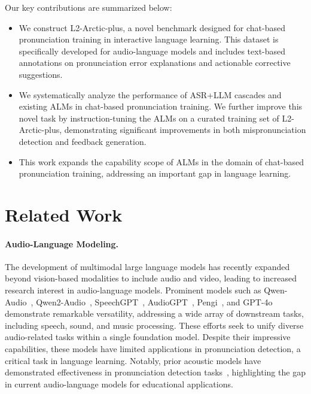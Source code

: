 \documentclass[11pt]{article}
\begin{document}
Our key contributions are summarized below: 
\begin{itemize}
    \item We construct L2-Arctic-plus, a novel benchmark designed for chat-based pronunciation training in interactive language learning. This dataset is specifically developed for audio-language models and includes text-based annotations on pronunciation error explanations and actionable corrective suggestions. 
    \item We systematically analyze the performance of ASR+LLM cascades and existing ALMs in chat-based pronunciation training. We further improve this novel task by instruction-tuning the ALMs on a curated training set of L2-Arctic-plus, demonstrating significant improvements in both mispronunciation detection and feedback generation.
    \item This work expands the capability scope of ALMs in the domain of chat-based pronunciation training, addressing an important gap in language learning. %
\end{itemize}


\section{Related Work}

\paragraph{Audio-Language Modeling.} The development of multimodal large language models has recently expanded beyond vision-based modalities to include audio and video, leading to increased research interest in audio-language models. Prominent models such as Qwen-Audio~\cite{qwen-audio-1}, Qwen2-Audio~\cite{qwen-audio-2}, SpeechGPT~\cite{speechgpt}, AudioGPT~\cite{audiogpt}, Pengi~\cite{pengi}, and GPT-4o~\cite{gpt-4o} demonstrate remarkable versatility, addressing a wide array of downstream tasks, including speech, sound, and music processing. These efforts seek to unify diverse audio-related tasks within a single foundation model. Despite their impressive capabilities, these models have limited applications in pronunciation detection, a critical task in language learning. Notably, prior acoustic models have demonstrated effectiveness in pronunciation detection tasks~\cite{hu2015improved,gopwav2vec,korzekwa2021mispronunciation}, highlighting the gap in current audio-language models for educational applications.
\end{document}
